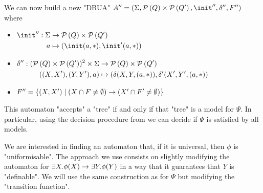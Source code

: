 \documentclass[twoside]{article}
\begin{document}
We can now build a new "DBUA" $A'' = (\Sigma, \parts Q \times \parts {Q'}, \init'', \delta'', F'')$ where
\begin{itemize}
	\item$\begin{aligned}[t]
			      \init'' : \Sigma & \to      \parts Q \times \parts {Q'} \\
			      a                & \mapsto  ( \init(a,*) , \init'(a,*))
		      \end{aligned}$

	\item$\begin{aligned}[t]
			      \delta'' : (\mathcal{P}\left(Q\right) \times \mathcal{P}\left(Q'\right))^2 \times \Sigma & \to      \mathcal{P}\left(Q\right) \times \mathcal{P}\left(Q'\right)             \\
			      ((X,X'),(Y,Y'),a)                                        & \mapsto (\delta(X,Y,(a,*)), \delta'(X',Y',(a,*))
		      \end{aligned}$

	\item $F'' = \left\{(X,X') \mid (X \cap F \neq \emptyset) \rightarrow (X' \cap F' \neq \emptyset)\right\}$
\end{itemize}
This automaton "accepts" a "tree" if and only if that "tree" is a model for $\Psi$. In particular, using the decision procedure
from  we can decide if $\Psi$ is satisfied by all models.

We are interested in finding an automaton that, if it is universal, then $\phi$ is "uniformisable". The approach we use consists on slightly modifying
the automaton for $\exists X. \phi(X) \rightarrow \exists Y. \phi (Y)$ in a way that it guarantees that $Y$ is "definable". We will use the same construction as for $\Psi$ but modifying
the "transition function".
\end{document}
